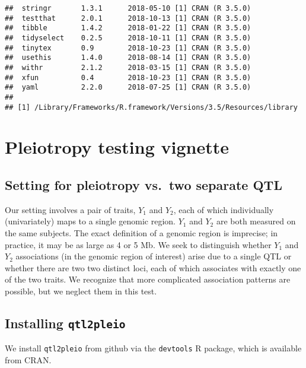 \documentclass[oneside]{book}
\begin{document}
\begin{verbatim}
##  stringr       1.3.1      2018-05-10 [1] CRAN (R 3.5.0)                   
##  testthat      2.0.1      2018-10-13 [1] CRAN (R 3.5.0)                   
##  tibble        1.4.2      2018-01-22 [1] CRAN (R 3.5.0)                   
##  tidyselect    0.2.5      2018-10-11 [1] CRAN (R 3.5.0)                   
##  tinytex       0.9        2018-10-23 [1] CRAN (R 3.5.0)                   
##  usethis       1.4.0      2018-08-14 [1] CRAN (R 3.5.0)                   
##  withr         2.1.2      2018-03-15 [1] CRAN (R 3.5.0)                   
##  xfun          0.4        2018-10-23 [1] CRAN (R 3.5.0)                   
##  yaml          2.2.0      2018-07-25 [1] CRAN (R 3.5.0)                   
## 
## [1] /Library/Frameworks/R.framework/Versions/3.5/Resources/library
\end{verbatim}

\section{Pleiotropy testing vignette}

\hypertarget{setting-for-pleiotropy-vs.two-separate-qtl}{%
\subsection{Setting for pleiotropy vs.~two separate
QTL}\label{setting-for-pleiotropy-vs.two-separate-qtl}}

Our setting involves a pair of traits, \(Y_1\) and \(Y_2\), each of
which individually (univariately) maps to a single genomic region.
\(Y_1\) and \(Y_2\) are both measured on the same subjects. The exact
definition of a genomic region is imprecise; in practice, it may be as
large as 4 or 5 Mb. We seek to distinguish whether \(Y_1\) and \(Y_2\)
associations (in the genomic region of interest) arise due to a single
QTL or whether there are two two distinct loci, each of which associates
with exactly one of the two traits. We recognize that more complicated
association patterns are possible, but we neglect them in this test.

\hypertarget{installing-qtl2pleio}{%
\subsection{\texorpdfstring{Installing
\texttt{qtl2pleio}}{Installing qtl2pleio}}\label{installing-qtl2pleio}}

We install \texttt{qtl2pleio} from github via the \texttt{devtools} R
package, which is available from CRAN.
\end{document}
